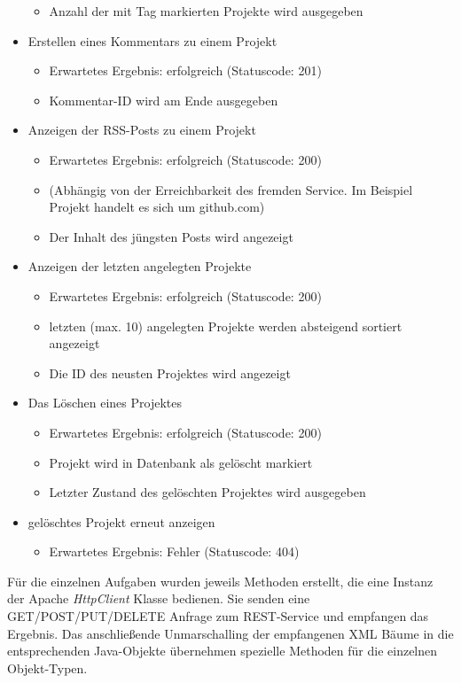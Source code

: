 \documentclass[12pt]{scrartcl}
\begin{document}
\begin{itemize}
\begin{itemize}
			\item Anzahl der mit Tag markierten Projekte wird ausgegeben
		\end{itemize}
		\item Erstellen eines Kommentars zu einem Projekt
		\begin{itemize}
			\item Erwartetes Ergebnis: erfolgreich (Statuscode: 201)
			\item Kommentar-ID wird am Ende ausgegeben
		\end{itemize}
		\item Anzeigen der RSS-Posts zu einem Projekt
		\begin{itemize}
			\item Erwartetes Ergebnis: erfolgreich (Statuscode: 200)
			\item (Abhängig von der Erreichbarkeit des fremden Service. Im Beispiel Projekt handelt es sich um github.com)
			\item Der Inhalt des jüngsten Posts wird angezeigt
		\end{itemize}
		\item Anzeigen der letzten angelegten Projekte
		\begin{itemize}
			\item Erwartetes Ergebnis: erfolgreich (Statuscode: 200)
			\item letzten (max. 10) angelegten Projekte werden absteigend sortiert angezeigt
			\item Die ID des neusten Projektes wird angezeigt
		\end{itemize}
		\item Das Löschen eines Projektes
		\begin{itemize}
			\item Erwartetes Ergebnis: erfolgreich (Statuscode: 200)
			\item Projekt wird in Datenbank als gelöscht markiert
			\item Letzter Zustand des gelöschten Projektes wird ausgegeben
		\end{itemize}
		\item gelöschtes Projekt erneut anzeigen
		\begin{itemize}
			\item Erwartetes Ergebnis: Fehler (Statuscode: 404)
		\end{itemize}
		
	\end{itemize}
	
	Für die einzelnen Aufgaben wurden jeweils Methoden erstellt, die eine Instanz der Apache \emph{HttpClient} Klasse bedienen. Sie senden eine GET/POST/PUT/DELETE Anfrage zum REST-Service und empfangen das Ergebnis. Das anschließende Unmarschalling der empfangenen XML Bäume in die entsprechenden Java-Objekte übernehmen spezielle Methoden für die einzelnen Objekt-Typen.
	
\end{document}
